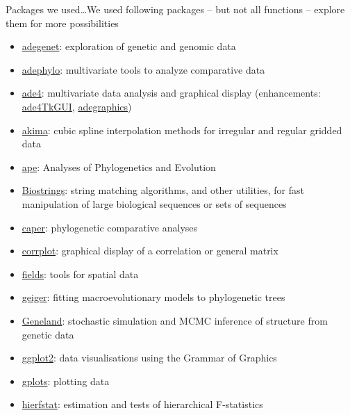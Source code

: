\documentclass[compress, ucs, xelatex, 11pt, xcolor=svgnames,
  hyperref={
    bookmarks=true,
    unicode=true,
    colorlinks=true,
    pdftitle={Molecular data in R},
    plainpages=false,
    pdfauthor={Vojtech Zeisek},
    pdfsubject={Course about phylogeny and evolution in R},
    pdfcreator={XeLaTeX},
    pdfkeywords={R, evolution, phylogeny, molecular data},
    linkcolor=Tomato,
    anchorcolor=SaddleBrown,
    citecolor=Goldenrod,
    filecolor=DarkMagenta,
    menucolor=Sienna,
    urlcolor=DarkTurquoise,
    pdftex},
  url={hyphens, lowtilde} %
  ]{beamer}
\begin{document}
\begin{frame}[allowframebreaks]{Packages we used\ldots}{We used following packages -- but not all functions -- explore them for more possibilities}
  \begin{itemize}
    \item \href{https://cran.r-project.org/package=adegenet}{adegenet}: exploration of genetic and genomic data
    \item \href{https://cran.r-project.org/package=adephylo}{adephylo}: multivariate tools to analyze comparative data
    \item \href{https://cran.r-project.org/package=ade4}{ade4}: multivariate data analysis and graphical display (enhancements: \href{https://cran.r-project.org/package=ade4TkGUI}{ade4TkGUI}, \href{https://cran.r-project.org/package=adegraphics}{adegraphics})
    \item \href{https://cran.r-project.org/package=akima}{akima}: cubic spline interpolation methods for irregular and regular gridded data
    \item \href{https://cran.r-project.org/package=ape}{ape}: Analyses of Phylogenetics and Evolution
    \item \href{https://www.bioconductor.org/packages/release/bioc/html/Biostrings.html}{Biostrings}: string matching algorithms, and other utilities, for fast manipulation of large biological sequences or sets of sequences
    \item \href{https://cran.r-project.org/package=caper}{caper}: phylogenetic comparative analyses
    \item \href{https://cran.r-project.org/package=corrplot}{corrplot}: graphical display of a correlation or general matrix
    \item \href{https://cran.r-project.org/package=fields}{fields}: tools for spatial data
    \item \href{https://cran.r-project.org/package=geiger}{geiger}: fitting macroevolutionary models to phylogenetic trees
    \item \href{https://cran.r-project.org/package=Geneland}{Geneland}: stochastic simulation and MCMC inference of structure from genetic data
    \item \href{https://cran.r-project.org/package=ggplot2}{ggplot2}: data visualisations using the Grammar of Graphics
    \item \href{https://cran.r-project.org/package=gplots}{gplots}: plotting data
    \item \href{https://cran.r-project.org/package=hierfstat}{hierfstat}: estimation and tests of hierarchical F-statistics

\end{itemize}
\end{frame}
\end{document}

